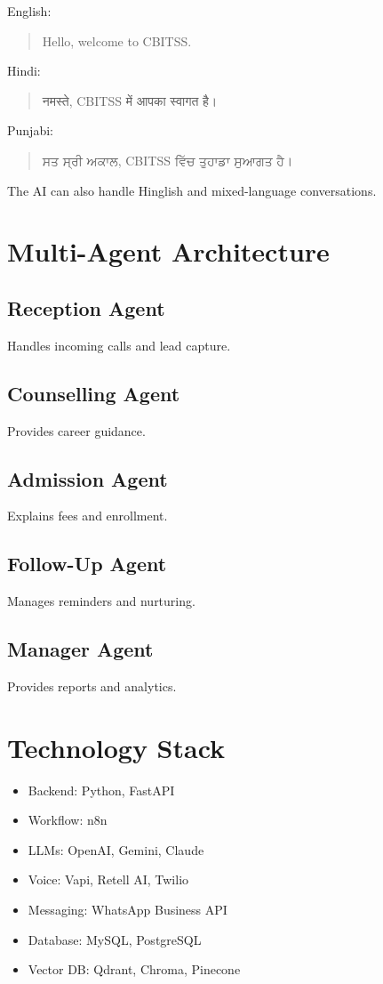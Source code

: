 \documentclass[11pt,a4paper]{article}
\begin{document}
English:
\begin{quote}
Hello, welcome to CBITSS.
\end{quote}

Hindi:
\begin{quote}
{\hindifont नमस्ते, CBITSS में आपका स्वागत है।}
\end{quote}

Punjabi:
\begin{quote}
{\punjabifont ਸਤ ਸ੍ਰੀ ਅਕਾਲ, CBITSS ਵਿੱਚ ਤੁਹਾਡਾ ਸੁਆਗਤ ਹੈ।}
\end{quote}

The AI can also handle Hinglish and mixed-language conversations.

\section{Multi-Agent Architecture}

\subsection{Reception Agent}
Handles incoming calls and lead capture.

\subsection{Counselling Agent}
Provides career guidance.

\subsection{Admission Agent}
Explains fees and enrollment.

\subsection{Follow-Up Agent}
Manages reminders and nurturing.

\subsection{Manager Agent}
Provides reports and analytics.

\section{Technology Stack}

\begin{itemize}
\item Backend: Python, FastAPI
\item Workflow: n8n
\item LLMs: OpenAI, Gemini, Claude
\item Voice: Vapi, Retell AI, Twilio
\item Messaging: WhatsApp Business API
\item Database: MySQL, PostgreSQL
\item Vector DB: Qdrant, Chroma, Pinecone
\end{itemize}
\end{document}
